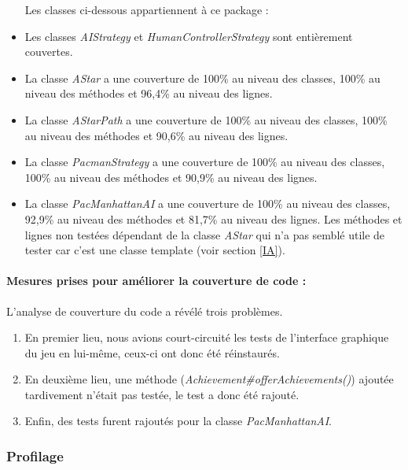 \documentclass[12pt, openany]{report}
\begin{document}
\begin{itemize}
Les classes ci-dessous appartiennent à ce package :\\ 
	\item Les classes \mbox{\textit{AIStrategy}} et \mbox{\textit{HumanControllerStrategy}} sont entièrement couvertes.
	\item La classe \mbox{\textit{AStar}} a une couverture de 100\% au niveau des classes, 100\% au niveau des méthodes et 96,4\% au niveau des lignes.
	\item La classe \mbox{\textit{AStarPath}} a une couverture de 100\% au niveau des classes, 100\% au niveau des méthodes et 90,6\% au niveau des lignes.
	\item La classe \mbox{\textit{PacmanStrategy}} a une couverture de 100\% au niveau des classes, 100\% au niveau des méthodes et 90,9\% au niveau des lignes.
	\item La classe \mbox{\textit{PacManhattanAI}} a une couverture de 100\% au niveau des classes, 92,9\% au niveau des méthodes et 81,7\% au niveau des lignes. Les méthodes et lignes non testées dépendant de la classe \textit{AStar} qui n'a pas semblé utile de tester car c'est une classe template (voir section \ref{IA}).
\end{itemize}


\paragraph{Mesures prises pour améliorer la couverture de code : }
L'analyse de couverture du code a révélé trois problèmes.

\begin{enumerate}
\item En premier lieu, nous avions \og court-circuité \fg les tests de l'interface graphique du jeu en lui-même, ceux-ci ont donc été réinstaurés.

\item En deuxième lieu, une méthode (\mbox{\textit{Achievement\#offerAchievements()}}) ajoutée tardivement n'était pas testée, le test a donc été rajouté.

\item Enfin, des tests furent rajoutés pour la classe \mbox{\textit{PacManhattanAI}}.
\end{enumerate}



\subsubsection{Profilage}
\end{document}
